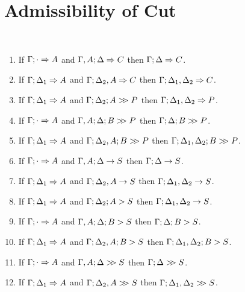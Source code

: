 \documentclass{sig-alt}
\begin{document}
\newpage

\section{Admissibility of Cut}

\begin{Teorema}\mbox{ }
\begin{enumerate}
\item If $\Gamma;\cdot\Rightarrow A$ and $\Gamma, A;\Delta\Rightarrow C$ then $\Gamma;\Delta\Rightarrow C$.
\item If $\Gamma;\Delta_1\Rightarrow A$ and $\Gamma;\Delta_2, A\Rightarrow C$ then $\Gamma;\Delta_1, \Delta_2\Rightarrow C$.
\\
\item If $\Gamma;\Delta_1\Rightarrow A$ and $\Gamma;\Delta_2;A\mathrel{>\!\! >}P$ then $\Gamma;\Delta_1, \Delta_2\Rightarrow P$.
\item If $\Gamma;\cdot\Rightarrow A$ and $\Gamma, A;\Delta;B\mathrel{>\!\! >}P$ then $\Gamma;\Delta;B\mathrel{>\!\! >}P$.
\item If $\Gamma;\Delta_1\Rightarrow A$ and $\Gamma;\Delta_2, A;B\mathrel{>\!\! >}P$ then $\Gamma;\Delta_1, \Delta_2;B\mathrel{>\!\! >}P$.
\\
\item If $\Gamma;\cdot\Rightarrow A$ and $\Gamma, A;\Delta\rightarrow S$ then $\Gamma;\Delta\rightarrow S$.
\item If $\Gamma;\Delta_1\Rightarrow A$ and $\Gamma;\Delta_2, A\rightarrow S$ then $\Gamma;\Delta_1, \Delta_2\rightarrow S$.
\\
\item If $\Gamma;\Delta_1\Rightarrow A$ and $\Gamma;\Delta_2;A\mathrel>S$ then $\Gamma;\Delta_1, \Delta_2\rightarrow S$.
\item If $\Gamma;\cdot\Rightarrow A$ and $\Gamma, A;\Delta;B\mathrel>S$ then $\Gamma;\Delta;B\mathrel>S$.
\item If $\Gamma;\Delta_1\Rightarrow A$ and $\Gamma;\Delta_2, A;B\mathrel>S$ then $\Gamma;\Delta_1, \Delta_2;B\mathrel>S$.
\\
\item If $\Gamma;\cdot\Rightarrow A$ and $\Gamma, A;\Delta\mathrel{>\!\! >}S$ then $\Gamma;\Delta\mathrel{>\!\! >}S$.
\item If $\Gamma;\Delta_1\Rightarrow A$ and $\Gamma;\Delta_2, A\mathrel{>\!\! >}S$ then $\Gamma;\Delta_1, \Delta_2\mathrel{>\!\! >}S$.
\\

\end{enumerate}
\end{Teorema}
\end{document}
